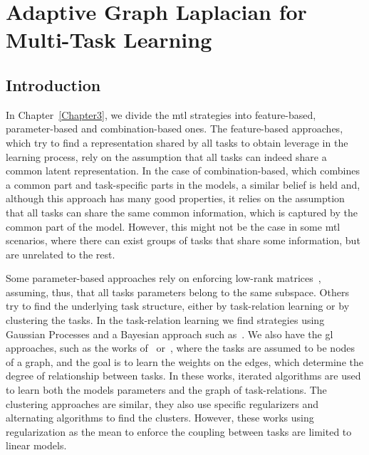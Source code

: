
\chapter{Adaptive Graph Laplacian for Multi-Task Learning} %
\label{Chapter5}

{\bf \small{

}}

\section{Introduction}
In Chapter~\ref{Chapter3}, we divide the \acrfull{mtl} strategies into feature-based, parameter-based and combination-based ones.
The feature-based approaches, which try to find a representation shared by all tasks to obtain leverage in the learning process, rely on the assumption that all tasks can indeed share a common latent representation.
In the case of combination-based, which combines a common part and task-specific parts in the models, a similar belief is held and, although this approach has many good properties, it relies on the assumption that all tasks can share the same common information, which is captured by the common part of the model.
However, this might not be the case in some \acrshort{mtl} scenarios, where there can exist groups of tasks that share some information, but are unrelated to the rest.

%
%
Some parameter-based approaches rely on enforcing low-rank matrices~\citep{AndoZ05,ChenTLY09,PongTJY10}, assuming, thus, that all tasks parameters belong to the same subspace. 
Others try to find the underlying task structure, either by task-relation learning or by clustering the tasks. In the task-relation learning we find strategies using Gaussian Processes and a Bayesian approach such as~\citet{BonillaCW07,ZhangY10}. We also have the \acrfull{gl} approaches, such as the works of~\citet{EvgeniouMP05} or~\citet{argyriou2013learning}, where the tasks are assumed to be nodes of a graph, and the goal is to learn the weights on the edges, which determine the degree of relationship between tasks.
 In these works, iterated algorithms are used to learn both the models parameters and the graph of task-relations.
The clustering approaches are similar, they also use specific regularizers and alternating algorithms to find the clusters.
However, these works using regularization as the mean to enforce the coupling between tasks are limited to linear models.

